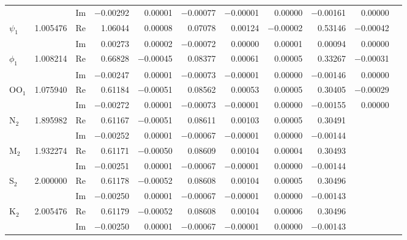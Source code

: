 \begin{table}
\begin{tabular}{@{}lrlrrrrrrrr@{}}
 & & Im & $-$0.00292 & 0.00001 & $-$0.00077 & $-$0.00001 & 0.00000 & $-$0.00161 & 0.00000 &  \\
$\psi_1$ & 1.005476 & Re & 1.06044 & 0.00008 & 0.07078 & 0.00124 & $-$0.00002 & 0.53146 & $-$0.00042 &  \\
 & & Im & 0.00273 & 0.00002 & $-$0.00072 & 0.00000 & 0.00001 & 0.00094 & 0.00000 &  \\
$\phi_1$ & 1.008214 & Re & 0.66828 & $-$0.00045 & 0.08377 & 0.00061 & 0.00005 & 0.33267 & $-$0.00031 &  \\
 & & Im & $-$0.00247 & 0.00001 & $-$0.00073 & $-$0.00001 & 0.00000 & $-$0.00146 & 0.00000 &  \\
OO$_1$ & 1.075940 & Re & 0.61184 & $-$0.00051 & 0.08562 & 0.00053 & 0.00005 & 0.30405 & $-$0.00029 &  \\
 & & Im & $-$0.00272 & 0.00001 & $-$0.00073 & $-$0.00001 & 0.00000 & $-$0.00155 & 0.00000 &  \\
\midrule
N$_2$ & 1.895982 & Re & 0.61167 & $-$0.00051 & 0.08611 & 0.00103 & 0.00005 & 0.30491 &  &  \\
 & & Im & $-$0.00252 & 0.00001 & $-$0.00067 & $-$0.00001 & 0.00000 & $-$0.00144 &  &  \\
M$_2$ & 1.932274 & Re & 0.61171 & $-$0.00050 & 0.08609 & 0.00104 & 0.00004 & 0.30493 &  &  \\
 & & Im & $-$0.00251 & 0.00001 & $-$0.00067 & $-$0.00001 & 0.00000 & $-$0.00144 &  &  \\
S$_2$ & 2.000000 & Re & 0.61178 & $-$0.00052 & 0.08608 & 0.00104 & 0.00005 & 0.30496 &  &  \\
 & & Im & $-$0.00250 & 0.00001 & $-$0.00067 & $-$0.00001 & 0.00000 & $-$0.00143 &  &  \\
K$_2$ & 2.005476 & Re & 0.61179 & $-$0.00052 & 0.08608 & 0.00104 & 0.00006 & 0.30496 &  &  \\
 & & Im & $-$0.00250 & 0.00001 & $-$0.00067 & $-$0.00001 & 0.00000 & $-$0.00143 &  &  \\
\bottomrule
\end{tabular}
\end{table}

